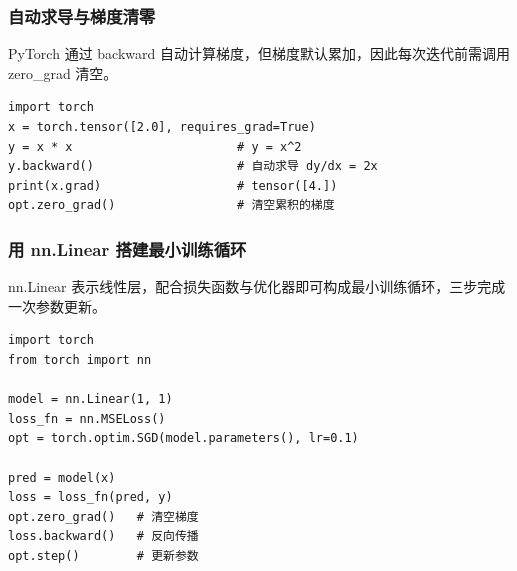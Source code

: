 \subsubsection{自动求导与梯度清零}
PyTorch 通过 backward 自动计算梯度，但梯度默认累加，因此每次迭代前需调用 zero\_grad 清空。
\begin{verbatim}
import torch
x = torch.tensor([2.0], requires_grad=True)
y = x * x                       # y = x^2
y.backward()                    # 自动求导 dy/dx = 2x
print(x.grad)                   # tensor([4.])
opt.zero_grad()                 # 清空累积的梯度
\end{verbatim}

\subsubsection{用 nn.Linear 搭建最小训练循环}
nn.Linear 表示线性层，配合损失函数与优化器即可构成最小训练循环，三步完成一次参数更新。
\begin{verbatim}
import torch
from torch import nn

model = nn.Linear(1, 1)
loss_fn = nn.MSELoss()
opt = torch.optim.SGD(model.parameters(), lr=0.1)

pred = model(x)
loss = loss_fn(pred, y)
opt.zero_grad()   # 清空梯度
loss.backward()   # 反向传播
opt.step()        # 更新参数
\end{verbatim}